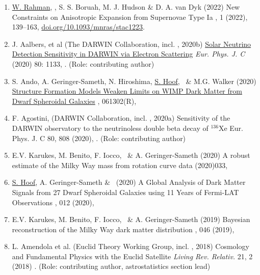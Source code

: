 \begin{enumerate}
\item 
\paper 
{\ul{W. Rahman}, \rt, S. S. Boruah, M. J. Hudson \& D. A. van Dyk (2022)}
{New Constraints on Anisotropic Expansion from Supernovae Type Ia}
{, 1 (2022), 139–163, \href{https://doi.org/10.1093/mnras/stac1223}{doi.org/10.1093/mnras/stac1223}}.

\item
\paper
{J. Aalbers, et al  (The DARWIN Collaboration, incl. \rt,  2020b)}
{\href{https://doi.org/10.1140/epjc/s10052-020-08602-7}{Solar Neutrino Detection Sensitivity in DARWIN via Electron Scattering}}
{{\em Eur. Phys. J. C} (2020) 80: 1133, . (Role: contributing author)}

\item
\paper
{S. Ando, A. Geringer-Sameth, N. Hiroshima, \ul{S. Hoof}, \rt\ \& M.G. Walker (2020)}
{\href{https://doi.org/10.1103/PhysRevD.102.061302}{Structure Formation Models Weaken Limits on WIMP Dark Matter from Dwarf Spheroidal Galaxies}}
{, 061302(R), }

\item
\paper
{F. Agostini, (DARWIN Collaboration, incl. \rt, 2020a)}
{Sensitivity of the DARWIN observatory to the neutrinoless double beta decay of $^{136}$Xe}
{Eur. Phys. J. C 80, 808 (2020), . (Role: contributing author)}

\item
\paper
{E.V. Karukes, M. Benito, F. Iocco, \rt\ \& A. Geringer-Sameth (2020)}
{A robust estimate of the Milky Way mass from rotation curve data}
{(2020)033, }

\item
\onestar \paper
{\ul{S. Hoof}, A. Geringer-Sameth \& \rt\ (2020)}
{A Global Analysis of Dark Matter Signals from 27 Dwarf Spheroidal Galaxies using 11 Years of Fermi-LAT Observations}
{, 012 (2020), }


\item 
\paper 
{E.V. Karukes, M. Benito, F. Iocco, \rt\ \& A. Geringer-Sameth (2019)}
{Bayesian reconstruction of the Milky Way dark matter distribution}
{, 046 (2019), }

\item  
 \fourstars \paper
{L. Amendola et al. (Euclid Theory Working Group, incl. \rt, 2018)}
{Cosmology and Fundamental Physics with the Euclid Satellite}
{{\em Living Rev. Relativ.} 21, 2 (2018)}
{. (Role: contributing author, astrostatistics section lead)}



\end{enumerate}
